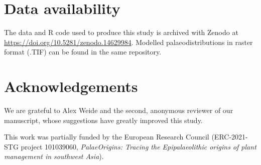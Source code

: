 \documentclass[
  authoryear,
  preprint]{elsarticle}
\begin{document}
\section{Data availability}\label{data-availability}

The data and R code used to produce this study is archived with Zenodo
at \url{https://doi.org/10.5281/zenodo.14629984}. Modelled
palaeodistributions in raster format (.TIF) can be found in the same
repository.

\section{Acknowledgements}\label{acknowledgements}

We are grateful to Alex Weide and the second, anonymous reviewer of our
manuscript, whose suggestions have greatly improved this study.

This work was partially funded by the European Research Council
(ERC-2021-STG project 101039060, \emph{PalaeOrigins: Tracing the
Epipalaeolithic origins of plant management in southwest Asia}).


\renewcommand\refname{References}

\end{document}
